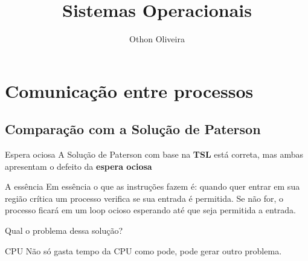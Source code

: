 \documentclass[11pt]{beamer}
\author{Othon Oliveira}
\title{Sistemas Operacionais}
\institute{Fatec -- Faculdade de Informática --- PE}
\begin{document}
\newcommand{\capa}{
    \begin{tikzpicture}[remember picture,overlay]
        \node at (current page.south west)
            {\begin{tikzpicture}[remember picture, overlay]
                \fill[shading=radial,top color=orange,bottom color=orange,middle color=yellow] (0,0) rectangle (\paperwidth,\paperheight);
            \end{tikzpicture}
          };
    \end{tikzpicture}
}




\begin{frame}
\titlepage
\end{frame}

\begin{frame}
\tableofcontents
\end{frame}



\section{Comunicação entre processos}
\subsection*{Comparação com a Solução de Paterson}

\begin{frame}{Espera ociosa}
 A Solução de Paterson com base na \textbf{TSL} está correta, mas ambas apresentam o defeito da \textbf{espera ociosa}
 
\pause
 \begin{block}{A essência}
  Em essência o que as instruções fazem é: quando quer entrar em sua região crítica um processo verifica se sua entrada é permitida.
  Se não for, o processo ficará em um loop ocioso esperando até que seja permitida a entrada.
 \end{block}
 
 \pause
 Qual o problema dessa solução?
 \pause
 \begin{block}{CPU}
  Não só gasta tempo da CPU como pode, pode gerar outro problema.
 \end{block}

\end{frame}
\end{document}
